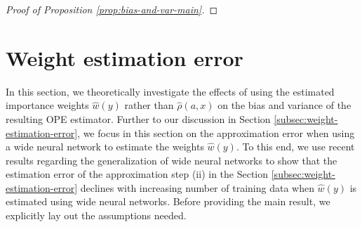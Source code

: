 \begin{proof}[Proof of Proposition \ref{prop:bias-and-var-main}]
\end{proof}



\section{Weight estimation error} \label{sec:wide_nns_weight_estimation}
In this section, we theoretically investigate the effects of using the estimated importance weights $\hat{w}(y)$ rather than $\hat{\rho}(a, x)$ on the bias and variance of the resulting OPE estimator. Further to our discussion in Section \ref{subsec:weight-estimation-error}, we focus in this section on the approximation error when using a wide neural network to estimate the weights $\hat{w}(y)$. To this end, we use recent results regarding the generalization of wide neural networks \citep{lai2023generalization} to show that the estimation error of the approximation step (ii) in the Section \ref{subsec:weight-estimation-error} declines with increasing number of training data when $\hat{w}(y)$ is estimated using wide neural networks. Before providing the main result, we explicitly lay out the assumptions needed.

